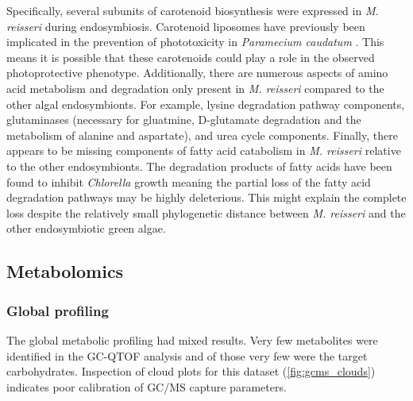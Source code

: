 Specifically, several subunits of carotenoid biosynthesis were expressed
in \textit{M. reisseri} during endosymbiosis.  Carotenoid liposomes
have previously been implicated in the prevention of phototoxicity
in \textit{Paramecium caudatum} \citep{Rich1992}.  This means
it is possible that these carotenoids could play a role in the observed photoprotective
phenotype.
Additionally, there are numerous aspects of amino acid metabolism and degradation
only present in \textit{M. reisseri} compared to the other algal endosymbionts.
For example, lysine degradation pathway components, 
glutaminases (necessary for gluatmine, D-glutamate degradation and the metabolism of
alanine and aspartate), and urea cycle components.
Finally, there appears to be missing components of fatty acid catabolism
in \textit{M. reisseri} relative to the other endosymbionts. The degradation
products of fatty acids have been found to inhibit \textit{Chlorella} growth \citep{Ikawa1997}
meaning the partial loss of the fatty acid degradation pathways may be 
highly deleterious.  This might explain the complete loss despite the relatively
small phylogenetic distance between \textit{M. reisseri} and the other endosymbiotic
green algae.



\subsection{Metabolomics} 

\subsubsection{Global profiling}

The global metabolic profiling had mixed results.
Very few metabolites were identified in the GC-QTOF
analysis and of those very few were the target carbohydrates.
Inspection of cloud plots for this dataset (\cref{fig:gcms_clouds})
indicates poor calibration of GC/MS capture parameters. 

